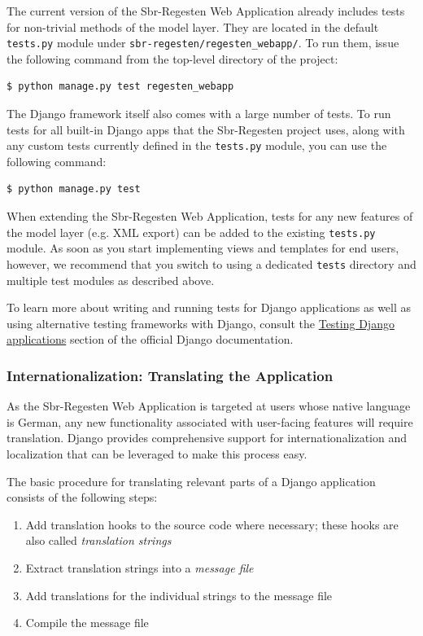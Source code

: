 The current version of the Sbr-Regesten Web Application already
includes tests for non-trivial methods of the model layer. They are
located in the default \texttt{tests.py} module under
\texttt{sbr-regesten/regesten\_webapp/}. To run them, issue the
following command from the top-level directory of the project:

\begin{verbatim}
$ python manage.py test regesten_webapp
\end{verbatim}

The Django framework itself also comes with a large number of tests.
To run tests for all built-in Django apps that the Sbr-Regesten
project uses, along with any custom tests currently defined in the
\texttt{tests.py} module, you can use the following command:

\begin{verbatim}
$ python manage.py test
\end{verbatim}

When extending the Sbr-Regesten Web Application, tests for any new
features of the model layer (e.g. XML export) can be added to the
existing \texttt{tests.py} module. As soon as you start implementing
views and templates for end users, however, we recommend that you
switch to using a dedicated \texttt{tests} directory and multiple test
modules as described above.

To learn more about writing and running tests for Django applications
as well as using alternative testing frameworks with Django, consult
the
\href{https://docs.djangoproject.com/en/1.4/topics/testing/}{Testing
  Django applications} section of the official Django documentation.

\subsubsection{Internationalization: Translating the Application}
\label{sec:translate}

As the Sbr-Regesten Web Application is targeted at users whose native
language is German, any new functionality associated with user-facing
features will require translation. Django provides comprehensive
support for internationalization and localization that can be
leveraged to make this process easy.

The basic procedure for translating relevant parts of a Django
application consists of the following steps:

\begin{enumerate}
\item Add translation hooks to the source code where necessary; these
  hooks are also called \emph{translation strings}
\item Extract translation strings into a \emph{message file}
\item Add translations for the individual strings to the message file
\item Compile the message file
\end{enumerate}

